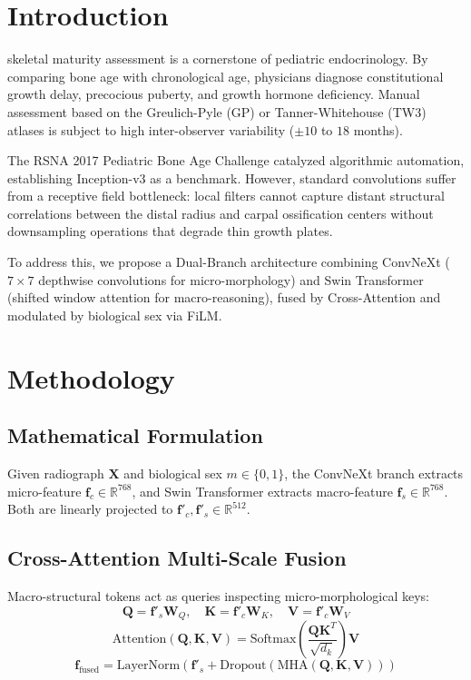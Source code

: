 \documentclass[journal]{IEEEtran}
\begin{document}
\section{Introduction}
 skeletal maturity assessment is a cornerstone of pediatric endocrinology. By comparing bone age with chronological age, physicians diagnose constitutional growth delay, precocious puberty, and growth hormone deficiency. Manual assessment based on the Greulich-Pyle (GP) or Tanner-Whitehouse (TW3) atlases is subject to high inter-observer variability ($\pm 10$ to $18$ months). 

The RSNA 2017 Pediatric Bone Age Challenge catalyzed algorithmic automation, establishing Inception-v3 as a benchmark. However, standard convolutions suffer from a receptive field bottleneck: local filters cannot capture distant structural correlations between the distal radius and carpal ossification centers without downsampling operations that degrade thin growth plates.

To address this, we propose a Dual-Branch architecture combining ConvNeXt ($7\times7$ depthwise convolutions for micro-morphology) and Swin Transformer (shifted window attention for macro-reasoning), fused by Cross-Attention and modulated by biological sex via FiLM.

\section{Methodology}
\subsection{Mathematical Formulation}
Given radiograph $\mathbf{X}$ and biological sex $m \in \{0, 1\}$, the ConvNeXt branch extracts micro-feature $\mathbf{f}_c \in \mathbb{R}^{768}$, and Swin Transformer extracts macro-feature $\mathbf{f}_s \in \mathbb{R}^{768}$. Both are linearly projected to $\mathbf{f}'_c, \mathbf{f}'_s \in \mathbb{R}^{512}$.

\subsection{Cross-Attention Multi-Scale Fusion}
Macro-structural tokens act as queries inspecting micro-morphological keys:
\begin{equation}
\mathbf{Q} = \mathbf{f}'_s \mathbf{W}_Q, \quad \mathbf{K} = \mathbf{f}'_c \mathbf{W}_K, \quad \mathbf{V} = \mathbf{f}'_c \mathbf{W}_V
\end{equation}
\begin{equation}
\text{Attention}(\mathbf{Q}, \mathbf{K}, \mathbf{V}) = \text{Softmax}\left(\frac{\mathbf{Q}\mathbf{K}^T}{\sqrt{d_k}}\right)\mathbf{V}
\end{equation}
\begin{equation}
\mathbf{f}_{\text{fused}} = \text{LayerNorm}\left(\mathbf{f}'_s + \text{Dropout}(\text{MHA}(\mathbf{Q}, \mathbf{K}, \mathbf{V}))\right)
\end{equation}
\end{document}
